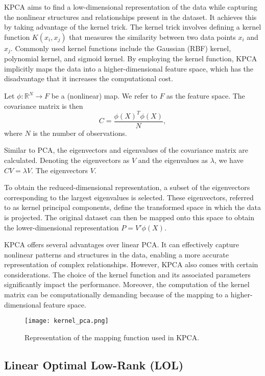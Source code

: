 KPCA aims to find a low-dimensional representation of the data while capturing the nonlinear structures and relationships present in the dataset. It achieves this by taking advantage of the kernel trick. The kernel trick involves defining a kernel function $K(x_i, x_j)$ that measures the similarity between two data points $x_i$ and $x_j$. Commonly used kernel functions include the Gaussian (RBF) kernel, polynomial kernel, and sigmoid kernel. By employing the kernel function, KPCA implicitly maps the data into a higher-dimensional feature space, which has the disadvantage that it increases the computational cost.

Let $\phi : \mathbb{R}^N \rightarrow F$ be a (nonlinear) map. We refer to $F$ as the feature space. The covariance matrix is then
\begin{equation}
  C = \frac{\phi(X)^T \phi(X)}{N},
\end{equation}
where $N$ is the number of observations.

Similar to PCA, the eigenvectors and eigenvalues of the covariance matrix are calculated. Denoting the eigenvectors as $V$ and the eigenvalues as $\lambda$, we have $C V = \lambda V$. The eigenvectors $V$.

To obtain the reduced-dimensional representation, a subset of the eigenvectors corresponding to the largest eigenvalues is selected. These eigenvectors, referred to as kernel principal components, define the transformed space in which the data is projected. The original dataset can then be mapped onto this space to obtain the lower-dimensional representation $P = V' \phi(X)$.

KPCA offers several advantages over linear PCA. It can effectively capture nonlinear patterns and structures in the data, enabling a more accurate representation of complex relationships.
However, KPCA also comes with certain considerations. The choice of the kernel function and its associated parameters significantly impact the performance. Moreover, the computation of the kernel matrix can be computationally demanding because of the mapping to a higher-dimensional feature space.

\begin{figure}
  \centering
  \texttt{[image: kernel\_pca.png]}
  \caption{Representation of the mapping function used in KPCA. \cite{kpca}}
  \label{fig:kernel_pca}
\end{figure}

\subsection{Linear Optimal Low-Rank (LOL)}

